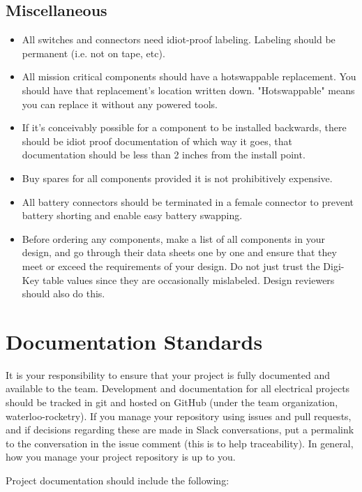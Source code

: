 \documentclass{article}
\begin{document}
\subsection{Miscellaneous}
\begin{itemize}
\item All switches and connectors need idiot-proof labeling. Labeling should be permanent (i.e. not on tape, etc).
\item All mission critical components should have a hotswappable replacement. You should have that replacement's location written down. "Hotswappable" means you can replace it without any powered tools.
\item If it's conceivably possible for a component to be installed backwards, there should be idiot proof documentation of which way it goes, that documentation should be less than 2 inches from the install point.
\item Buy spares for all components provided it is not prohibitively expensive.
\item All battery connectors should be terminated in a female connector to prevent battery shorting and enable easy battery swapping.
\item Before ordering any components, make a list of all components in your design, and go through their data sheets one by one and ensure that they meet or exceed the requirements of your design. Do not just trust the Digi-Key table values since they are occasionally mislabeled. Design reviewers should also do this.
\end{itemize}

\section{Documentation Standards}
It is your responsibility to ensure that your project is fully documented and available to the team. Development and documentation for all electrical projects should be tracked in git and hosted on GitHub (under the team organization, waterloo-rocketry). If you manage your repository using issues and pull requests, and if decisions regarding these are made in Slack conversations, put a permalink to the conversation in the issue comment (this is to help traceability). In general, how you manage your project repository is up to you.

Project documentation should include the following:
\end{document}
